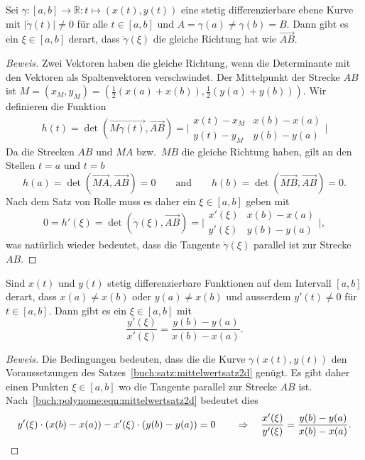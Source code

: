 \begin{satz}
\label{buch:satz:mittelwertsatz2d}
Sei $\gamma\colon[a,b]\to\mathbb R:t\mapsto (x(t),y(t))$ eine
stetig differenzierbare ebene Kurve mit $|\dot{\gamma}(t)|\ne 0$ für
alle $t\in[a,b]$ und $A=\gamma(a)\ne\gamma(b)=B$.
Dann gibt es ein $\xi\in[a,b]$ derart, dass $\dot{\gamma}(\xi)$ die gleiche
Richtung hat wie $\overrightarrow{AB}$.
\end{satz}

\begin{proof}[Beweis]
Zwei Vektoren haben die gleiche Richtung, wenn die Determinante
mit den Vektoren als Spaltenvektoren verschwindet.
%
Der Mittelpunkt der Strecke $AB$ ist
$M=(x_M,y_M) = (\frac12(x(a)+x(b)),\frac12(y(a)+y(b)))$.
Wir definieren die Funktion
\[
h(t)
=
\det(\overrightarrow{M\gamma(t)}, \overrightarrow{AB})
=
\biggl|
\begin{matrix}
x(t) - x_M & x(b)-x(a) \\
y(t) - y_M & y(b)-y(a)
\end{matrix}
\biggr|
\]
Da die Strecken $AB$ und $MA$ bzw.~$MB$ die gleiche Richtung haben,
gilt an den Stellen $t=a$ und $t=b$ 
\[
h(a)
=
\det (\overrightarrow{MA},\overrightarrow{AB})
= 0
\qquad\text{and}\qquad
h(b)
=
\det (\overrightarrow{MB},\overrightarrow{AB})
=
0.
\]
Nach dem Satz von Rolle muss es daher ein $\xi\in[a,b]$ geben mit
%
\begin{equation}
0
=
h'(\xi)
=
\det(
\dot{\gamma}(\xi),
\overrightarrow{AB}
)
=
\biggl|
\begin{matrix}
x'(\xi) & x(b)-x(a) \\
y'(\xi) & y(b)-y(a)
\end{matrix}
\biggr|,
\label{buch:polynome:eqn:mittelwertsatz2d}
\end{equation}
was natürlich wieder bedeutet, dass die Tangente $\dot{\gamma}(\xi)$ 
parallel ist zur Strecke $AB$.
\end{proof}


\begin{satz}
\label{buch:satz:vmittelwertsatz}
Sind $x(t)$ und $y(t)$ stetig differenzierbare Funktionen auf dem Intervall
$[a,b]$ derart, dass $x(a)\ne x(b)$ oder $y(a)\ne x(b)$ und ausserdem
$y'(t)\ne 0$ für $t\in[a,b]$.
Dann gibt es ein $\xi\in[a,b]$ mit
\[
\frac{y'(\xi)}{x'(\xi)}
=
\frac{y(b)-y(a)}{x(b)-x(a)}.
\]
\end{satz}

\begin{proof}[Beweis]
Die Bedingungen bedeuten, dass die die Kurve $\gamma(x(t),y(t))$
den Voraussetzungen des Satzes~\ref{buch:satz:mittelwertsatz2d}
genügt.
Es gibt daher einen Punkten $\xi\in[a,b]$ wo die Tangente
parallel zur Strecke $AB$ ist.
Nach~\ref{buch:polynome:eqn:mittelwertsatz2d} bedeutet dies
\[
y'(\xi) \cdot (x(b)-x(a))
-
x'(\xi) \cdot (y(b)-y(a))
=0
\qquad\Rightarrow\quad
\frac{x'(\xi)}{y'(\xi)}
=
\frac{y(b)-y(a)}{x(b)-x(a)}.
\qedhere
\]
\end{proof}

